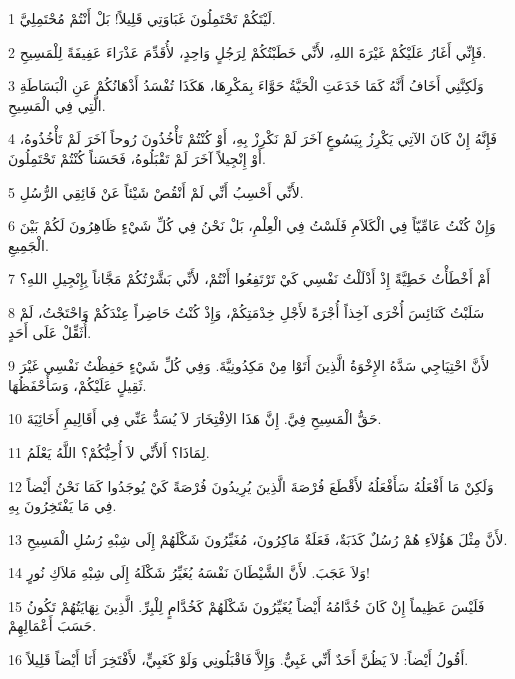 \par 1 لَيْتَكُمْ تَحْتَمِلُونَ غَبَاوَتِي قَلِيلاً! بَلْ أَنْتُمْ مُحْتَمِلِيَّ.
\par 2 فَإِنِّي أَغَارُ عَلَيْكُمْ غَيْرَةَ اللهِ، لأَنِّي خَطَبْتُكُمْ لِرَجُلٍ وَاحِدٍ، لأُقَدِّمَ عَذْرَاءَ عَفِيفَةً لِلْمَسِيحِ.
\par 3 وَلَكِنَّنِي أَخَافُ أَنَّهُ كَمَا خَدَعَتِ الْحَيَّةُ حَوَّاءَ بِمَكْرِهَا، هَكَذَا تُفْسَدُ أَذْهَانُكُمْ عَنِ الْبَسَاطَةِ الَّتِي فِي الْمَسِيحِ.
\par 4 فَإِنَّهُ إِنْ كَانَ الآتِي يَكْرِزُ بِيَسُوعٍ آخَرَ لَمْ نَكْرِزْ بِهِ، أَوْ كُنْتُمْ تَأْخُذُونَ رُوحاً آخَرَ لَمْ تَأْخُذُوهُ، أَوْ إِنْجِيلاً آخَرَ لَمْ تَقْبَلُوهُ، فَحَسَناً كُنْتُمْ تَحْتَمِلُونَ.
\par 5 لأَنِّي أَحْسِبُ أَنِّي لَمْ أَنْقُصْ شَيْئاً عَنْ فَائِقِي الرُّسُلِ.
\par 6 وَإِنْ كُنْتُ عَامِّيّاً فِي الْكَلاَمِ فَلَسْتُ فِي الْعِلْمِ، بَلْ نَحْنُ فِي كُلِّ شَيْءٍ ظَاهِرُونَ لَكُمْ بَيْنَ الْجَمِيعِ.
\par 7 أَمْ أَخْطَأْتُ خَطِيَّةً إِذْ أَذْلَلْتُ نَفْسِي كَيْ تَرْتَفِعُوا أَنْتُمْ، لأَنِّي بَشَّرْتُكُمْ مَجَّاناً بِإِنْجِيلِ اللهِ؟
\par 8 سَلَبْتُ كَنَائِسَ أُخْرَى آخِذاً أُجْرَةً لأَجْلِ خِدْمَتِكُمْ، وَإِذْ كُنْتُ حَاضِراً عِنْدَكُمْ وَاحْتَجْتُ، لَمْ أُثَقِّلْ عَلَى أَحَدٍ.
\par 9 لأَنَّ احْتِيَاجِي سَدَّهُ الإِخْوَةُ الَّذِينَ أَتَوْا مِنْ مَكِدُونِيَّةَ. وَفِي كُلِّ شَيْءٍ حَفِظْتُ نَفْسِي غَيْرَ ثَقِيلٍ عَلَيْكُمْ، وَسَأَحْفَظُهَا.
\par 10 حَقُّ الْمَسِيحِ فِيَّ. إِنَّ هَذَا الاِفْتِخَارَ لاَ يُسَدُّ عَنِّي فِي أَقَالِيمِ أَخَائِيَةَ.
\par 11 لِمَاذَا؟ أَلأَنِّي لاَ أُحِبُّكُمْ؟ اللَّهُ يَعْلَمُ.
\par 12 وَلَكِنْ مَا أَفْعَلُهُ سَأَفْعَلُهُ لأَقْطَعَ فُرْصَةَ الَّذِينَ يُرِيدُونَ فُرْصَةً كَيْ يُوجَدُوا كَمَا نَحْنُ أَيْضاً فِي مَا يَفْتَخِرُونَ بِهِ.
\par 13 لأَنَّ مِثْلَ هَؤُلاَءِ هُمْ رُسُلٌ كَذَبَةٌ، فَعَلَةٌ مَاكِرُونَ، مُغَيِّرُونَ شَكْلَهُمْ إِلَى شِبْهِ رُسُلِ الْمَسِيحِ.
\par 14 وَلاَ عَجَبَ. لأَنَّ الشَّيْطَانَ نَفْسَهُ يُغَيِّرُ شَكْلَهُ إِلَى شِبْهِ مَلاَكِ نُورٍ!
\par 15 فَلَيْسَ عَظِيماً إِنْ كَانَ خُدَّامُهُ أَيْضاً يُغَيِّرُونَ شَكْلَهُمْ كَخُدَّامٍ لِلْبِرِّ. الَّذِينَ نِهَايَتُهُمْ تَكُونُ حَسَبَ أَعْمَالِهِمْ.
\par 16 أَقُولُ أَيْضاً: لاَ يَظُنَّ أَحَدٌ أَنِّي غَبِيٌّ. وَإِلاَّ فَاقْبَلُونِي وَلَوْ كَغَبِيٍّ، لأَفْتَخِرَ أَنَا أَيْضاً قَلِيلاً.
